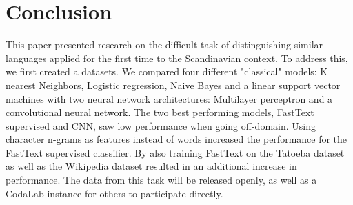 \section{Conclusion}
This paper presented research on the difficult task of distinguishing similar languages applied for the first time to the Scandinavian context. To address this, we first created a datasets.  We compared four different "classical" models: K nearest Neighbors, Logistic regression, Naive Bayes and a linear support vector machines with two neural network architectures: Multilayer perceptron and a convolutional neural network.
The two best performing models, FastText supervised and CNN, saw low performance when going off-domain. Using character n-grams as features instead of words increased the performance for the FastText supervised classifier. By also training FastText on the Tatoeba dataset as well as the Wikipedia dataset resulted in an additional increase in performance.
The data from this task will be released openly, as well as a CodaLab instance for others to participate directly.

